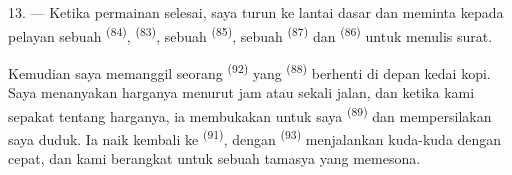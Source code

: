 13. --- Ketika permainan selesai, saya turun ke lantai dasar dan
meminta kepada pelayan sebuah  \textsuperscript{(84)},
 \textsuperscript{(83)}, sebuah 
\textsuperscript{(85)}, sebuah  \textsuperscript{(87)} dan
 \textsuperscript{(86)} untuk menulis surat.

Kemudian saya memanggil seorang  \textsuperscript{(92)}
yang  \textsuperscript{(88)} berhenti di depan kedai
kopi. Saya menanyakan harganya menurut jam atau sekali jalan, dan
ketika kami sepakat tentang harganya, ia membukakan untuk saya
 \textsuperscript{(89)} dan mempersilakan saya
duduk. Ia naik kembali ke 
\textsuperscript{(91)}, dengan  \textsuperscript{(93)}
menjalankan kuda-kuda dengan cepat, dan kami berangkat untuk sebuah
tamasya yang memesona.

\VUsaut{6.0mm}
\VUfilet{22mm}

